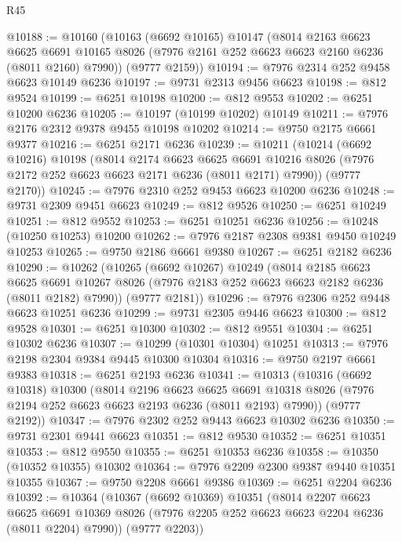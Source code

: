 \begin{lexlean}{R45}
\begin{coremodule}
{@10188 := @10160
    (@10163
      (@6692 @10165)
      @10147
      (@8014
        @2163
        @6623
        @6625
        @6691
        @10165
        @8026
        (@7976 @2161 @252 @6623 @6623 @2160 @6236 (@8011 @2160) @7990))
      (@9777 @2159))
@10194 := @7976 @2314 @252 @9458 @6623 @10149 @6236
@10197 := @9731 @2313 @9456 @6623
@10198 := @812 @9524
@10199 := @6251 @10198
@10200 := @812 @9553
@10202 := @6251 @10200 @6236
@10205 := @10197 (@10199 @10202) @10149
@10211 := @7976 @2176 @2312 @9378 @9455 @10198 @10202
@10214 := @9750 @2175 @6661 @9377
@10216 := @6251 @2171 @6236
@10239 := @10211
    (@10214
      (@6692 @10216)
      @10198
      (@8014
        @2174
        @6623
        @6625
        @6691
        @10216
        @8026
        (@7976 @2172 @252 @6623 @6623 @2171 @6236 (@8011 @2171) @7990))
      (@9777 @2170))
@10245 := @7976 @2310 @252 @9453 @6623 @10200 @6236
@10248 := @9731 @2309 @9451 @6623
@10249 := @812 @9526
@10250 := @6251 @10249
@10251 := @812 @9552
@10253 := @6251 @10251 @6236
@10256 := @10248 (@10250 @10253) @10200
@10262 := @7976 @2187 @2308 @9381 @9450 @10249 @10253
@10265 := @9750 @2186 @6661 @9380
@10267 := @6251 @2182 @6236
@10290 := @10262
    (@10265
      (@6692 @10267)
      @10249
      (@8014
        @2185
        @6623
        @6625
        @6691
        @10267
        @8026
        (@7976 @2183 @252 @6623 @6623 @2182 @6236 (@8011 @2182) @7990))
      (@9777 @2181))
@10296 := @7976 @2306 @252 @9448 @6623 @10251 @6236
@10299 := @9731 @2305 @9446 @6623
@10300 := @812 @9528
@10301 := @6251 @10300
@10302 := @812 @9551
@10304 := @6251 @10302 @6236
@10307 := @10299 (@10301 @10304) @10251
@10313 := @7976 @2198 @2304 @9384 @9445 @10300 @10304
@10316 := @9750 @2197 @6661 @9383
@10318 := @6251 @2193 @6236
@10341 := @10313
    (@10316
      (@6692 @10318)
      @10300
      (@8014
        @2196
        @6623
        @6625
        @6691
        @10318
        @8026
        (@7976 @2194 @252 @6623 @6623 @2193 @6236 (@8011 @2193) @7990))
      (@9777 @2192))
@10347 := @7976 @2302 @252 @9443 @6623 @10302 @6236
@10350 := @9731 @2301 @9441 @6623
@10351 := @812 @9530
@10352 := @6251 @10351
@10353 := @812 @9550
@10355 := @6251 @10353 @6236
@10358 := @10350 (@10352 @10355) @10302
@10364 := @7976 @2209 @2300 @9387 @9440 @10351 @10355
@10367 := @9750 @2208 @6661 @9386
@10369 := @6251 @2204 @6236
@10392 := @10364
    (@10367
      (@6692 @10369)
      @10351
      (@8014
        @2207
        @6623
        @6625
        @6691
        @10369
        @8026
        (@7976 @2205 @252 @6623 @6623 @2204 @6236 (@8011 @2204) @7990))
      (@9777 @2203))
}
\end{coremodule}
\end{lexlean}
